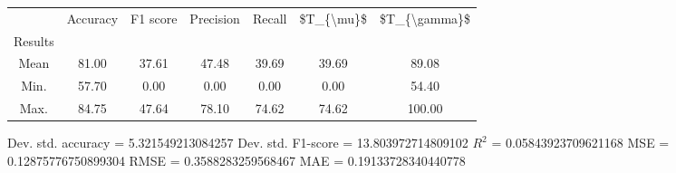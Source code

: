\begin{tabular}{|c|c|c|c|c|c|c|}
\toprule
{} &  Accuracy &  F1 score &  Precision &  Recall &  \$T\_\{\textbackslash mu\}\$ &  \$T\_\{\textbackslash gamma\}\$ \\
Results &           &           &            &         &            &               \\
\hline
Mean    &     81.00 &     37.61 &      47.48 &   39.69 &      39.69 &         89.08 \\
Min.    &     57.70 &      0.00 &       0.00 &    0.00 &       0.00 &         54.40 \\
Max.    &     84.75 &     47.64 &      78.10 &   74.62 &      74.62 &        100.00 \\
\bottomrule
\end{tabular}

 Dev. std. accuracy = 5.321549213084257
 Dev. std. F1-score = 13.803972714809102
 $R^2$ = 0.05843923709621168
 MSE = 0.12875776750899304
 RMSE = 0.3588283259568467
 MAE = 0.19133728340440778